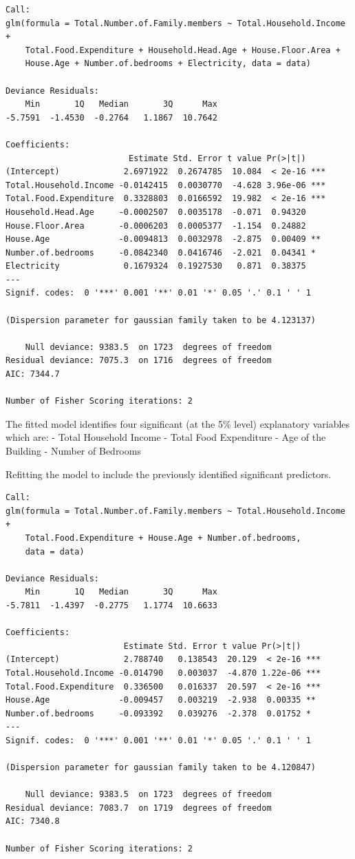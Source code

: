 \documentclass[
]{article}
\begin{document}
\begin{verbatim}
Call:
glm(formula = Total.Number.of.Family.members ~ Total.Household.Income + 
    Total.Food.Expenditure + Household.Head.Age + House.Floor.Area + 
    House.Age + Number.of.bedrooms + Electricity, data = data)

Deviance Residuals: 
    Min       1Q   Median       3Q      Max  
-5.7591  -1.4530  -0.2764   1.1867  10.7642  

Coefficients:
                         Estimate Std. Error t value Pr(>|t|)    
(Intercept)             2.6971922  0.2674785  10.084  < 2e-16 ***
Total.Household.Income -0.0142415  0.0030770  -4.628 3.96e-06 ***
Total.Food.Expenditure  0.3328803  0.0166592  19.982  < 2e-16 ***
Household.Head.Age     -0.0002507  0.0035178  -0.071  0.94320    
House.Floor.Area       -0.0006203  0.0005377  -1.154  0.24882    
House.Age              -0.0094813  0.0032978  -2.875  0.00409 ** 
Number.of.bedrooms     -0.0842340  0.0416746  -2.021  0.04341 *  
Electricity             0.1679324  0.1927530   0.871  0.38375    
---
Signif. codes:  0 '***' 0.001 '**' 0.01 '*' 0.05 '.' 0.1 ' ' 1

(Dispersion parameter for gaussian family taken to be 4.123137)

    Null deviance: 9383.5  on 1723  degrees of freedom
Residual deviance: 7075.3  on 1716  degrees of freedom
AIC: 7344.7

Number of Fisher Scoring iterations: 2
\end{verbatim}

The fitted model identifies four significant (at the 5\% level)
explanatory variables which are: - Total Household Income - Total Food
Expenditure - Age of the Building - Number of Bedrooms

Refitting the model to include the previously identified significant
predictors.

\begin{verbatim}
Call:
glm(formula = Total.Number.of.Family.members ~ Total.Household.Income + 
    Total.Food.Expenditure + House.Age + Number.of.bedrooms, 
    data = data)

Deviance Residuals: 
    Min       1Q   Median       3Q      Max  
-5.7811  -1.4397  -0.2775   1.1774  10.6633  

Coefficients:
                        Estimate Std. Error t value Pr(>|t|)    
(Intercept)             2.788740   0.138543  20.129  < 2e-16 ***
Total.Household.Income -0.014790   0.003037  -4.870 1.22e-06 ***
Total.Food.Expenditure  0.336500   0.016337  20.597  < 2e-16 ***
House.Age              -0.009457   0.003219  -2.938  0.00335 ** 
Number.of.bedrooms     -0.093392   0.039276  -2.378  0.01752 *  
---
Signif. codes:  0 '***' 0.001 '**' 0.01 '*' 0.05 '.' 0.1 ' ' 1

(Dispersion parameter for gaussian family taken to be 4.120847)

    Null deviance: 9383.5  on 1723  degrees of freedom
Residual deviance: 7083.7  on 1719  degrees of freedom
AIC: 7340.8

Number of Fisher Scoring iterations: 2
\end{verbatim}
\end{document}
